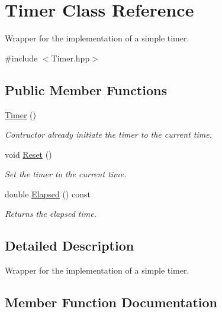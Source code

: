 \hypertarget{class_timer}{}\section{Timer Class Reference}
\label{class_timer}


Wrapper for the implementation of a simple timer.  




{\ttfamily \#include $<$Timer.\+hpp$>$}

\subsection*{Public Member Functions}
\begin{DoxyCompactItemize}
\item 
\mbox{\label{class_timer_a5f16e8da27d2a5a5242dead46de05d97}} 
\mbox{\hyperlink{class_timer_a5f16e8da27d2a5a5242dead46de05d97}{Timer}} ()
\begin{DoxyCompactList}\small\item\em Contructor already initiate the timer to the current time. \end{DoxyCompactList}\item 
\mbox{\label{class_timer_ae7c0c1e7d12de4b8a6e7c64e451cdd2a}} 
void \mbox{\hyperlink{class_timer_ae7c0c1e7d12de4b8a6e7c64e451cdd2a}{Reset}} ()
\begin{DoxyCompactList}\small\item\em Set the timer to the current time. \end{DoxyCompactList}\item 
double \mbox{\hyperlink{class_timer_a23ceb8d8848ca88a46a5df2b07e27516}{Elapsed}} () const
\begin{DoxyCompactList}\small\item\em Returns the elapsed time. \end{DoxyCompactList}\end{DoxyCompactItemize}


\subsection{Detailed Description}
Wrapper for the implementation of a simple timer. 

\subsection{Member Function Documentation}
\mbox{\label{class_timer_a23ceb8d8848ca88a46a5df2b07e27516}} 
